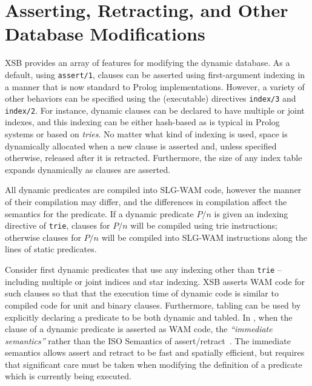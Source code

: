 
\section{Asserting, Retracting, and Other Database Modifications} \label{sec:assert}

XSB provides an array of features for modifying the dynamic database.
As a default, using {\tt assert/1}, clauses can be asserted using
first-argument indexing in a manner that is now standard to Prolog
implementations.  However, a variety of other behaviors can be
specified using the (executable) directives {\tt index/3} and {\tt
  index/2}.  For instance, dynamic clauses can be declared to have
multiple or joint indexes, and this indexing can be either hash-based
as is typical in Prolog systems or based on {\em tries}.  No matter
what kind of indexing is used, space is dynamically allocated when a
new clause is asserted and, unless specified otherwise, released after
it is retracted.  Furthermore, the size of any index table expands
dynamically as clauses are asserted.

All dynamic predicates are compiled into SLG-WAM code, however the
manner of their compilation may differ, and the differences in
compilation affect the semantics for the predicate.  If a dynamic
predicate $P/n$ is given an indexing directive of {\tt trie}, clauses
for $P/n$ will be compiled using trie instructions; otherwise clauses
for $P/n$ will be compiled into SLG-WAM instructions along the lines
of static predicates. 

Consider first dynamic predicates that use any indexing other than
{\tt trie} -- including multiple or joint indices and star indexing.
XSB asserts WAM code for such clauses so that that the execution time
of dynamic code is similar to compiled code for unit and binary
clauses.  Furthermore, tabling can be used by explicitly declaring a
predicate to be both dynamic and tabled.  In \version{}, when the
clause of a dynamic predicate is asserted as WAM code, the {\em
  ``immediate semantics''} rather than the ISO Semantics of
assert/retract~\cite{LiOk87}.  The immediate semantics allows assert
and retract to be fast and spatially efficient, but requires that
significant care must be taken when modifying the definition of a
predicate which is currently being executed.

